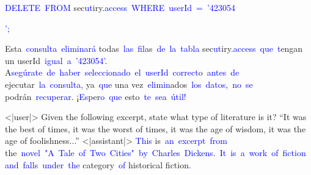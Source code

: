 \documentclass{article}
\begin{document}
\begin{tcolorbox}[colframe=black,colback=white]
{}\textcolor{blue}{DELETE}\textcolor{blue}{~FROM} sec\textcolor{blue}{ut}iry\textcolor{blue}{.access}\textcolor{blue}{~WHERE}\textcolor{blue}{~userId}\textcolor{blue}{~=}\textcolor{blue}{~'}\textcolor{blue}{423}\textcolor{blue}{054}\textcolor{blue}{';

}Esta\textcolor{blue}{~consulta}\textcolor{blue}{~eliminar}\textcolor{blue}{á} todas\textcolor{blue}{~las}\textcolor{blue}{~fil}as\textcolor{blue}{~de}\textcolor{blue}{~la}\textcolor{blue}{~tabla} sec\textcolor{blue}{ut}iry\textcolor{blue}{.access}\textcolor{blue}{~que}\textcolor{blue}{~t}engan un userId\textcolor{blue}{~igual}\textcolor{blue}{~a}\textcolor{blue}{~'}\textcolor{blue}{423}\textcolor{blue}{054}\textcolor{blue}{'.} A\textcolor{blue}{seg}\textcolor{blue}{ú}\textcolor{blue}{rate}\textcolor{blue}{~de}\textcolor{blue}{~haber}\textcolor{blue}{~seleccion}\textcolor{blue}{ado}\textcolor{blue}{~el}\textcolor{blue}{~userId}\textcolor{blue}{~correct}o\textcolor{blue}{~antes}\textcolor{blue}{~de} ejecutar\textcolor{blue}{~la}\textcolor{blue}{~consulta}, ya\textcolor{blue}{~que} una vez\textcolor{blue}{~elimin}ados\textcolor{blue}{~los}\textcolor{blue}{~datos}\textcolor{blue}{,}\textcolor{blue}{~no}\textcolor{blue}{~se} podrán\textcolor{blue}{~recuper}\textcolor{blue}{ar}\textcolor{blue}{.} ¡\textcolor{blue}{Es}per\textcolor{blue}{o}\textcolor{blue}{~que} esto\textcolor{blue}{~te}\textcolor{blue}{~sea}\textcolor{blue}{~ú}\textcolor{blue}{til}\textcolor{blue}{!}\textcolor{blue}{}
\end{tcolorbox}


\begin{tcolorbox}[colframe=black,colback=white]
<|user|>
Given the following excerpt, state what type of literature is it?
“It was the best of times, it was the worst of times, it was the age of wisdom, it was the age of foolishness...”
<|assistant|>
\textcolor{blue}{This} is\textcolor{blue}{~an}\textcolor{blue}{~excerpt}\textcolor{blue}{~from} the\textcolor{blue}{~novel}\textcolor{blue}{~"}\textcolor{blue}{A}\textcolor{blue}{~Tale}\textcolor{blue}{~of}\textcolor{blue}{~Two}\textcolor{blue}{~Cities}\textcolor{blue}{"}\textcolor{blue}{~by}\textcolor{blue}{~Charles}\textcolor{blue}{~Dickens}.\textcolor{blue}{~It}\textcolor{blue}{~is}\textcolor{blue}{~a}\textcolor{blue}{~work}\textcolor{blue}{~of}\textcolor{blue}{~fiction}\textcolor{blue}{~and}\textcolor{blue}{~falls}\textcolor{blue}{~under}\textcolor{blue}{~the} category\textcolor{blue}{~of} historical fiction\textcolor{blue}{.}\textcolor{blue}{}
\end{tcolorbox}
\end{document}
